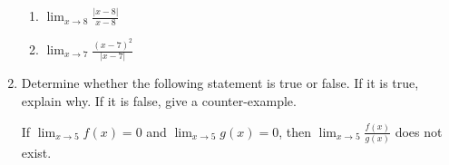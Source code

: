 \documentclass[12pt]{report}
\begin{document}
\begin{enumerate}
\begin{enumerate}


\item $\displaystyle\lim_{x \to 8}\frac{|x-8|}{x-8}$
\vskip 4cm

\item $\displaystyle\lim_{x \to 7}\frac{(x-7)^2}{|x-7|}$
\vskip 4cm

\end{enumerate}	

\item Determine whether the following statement is true or false. If it is true, explain why.  If it is false, give a counter-example. \\

\begin{center}
If $\displaystyle{\lim_{x\to 5}} f(x) = 0$ and $\displaystyle{\lim_{x\to 5}} g(x) = 0$, then $\displaystyle{\lim_{x\to 5}} \frac{f(x)}{g(x)}$ does not exist. 
\end{center}


\end{enumerate}
\end{document}
